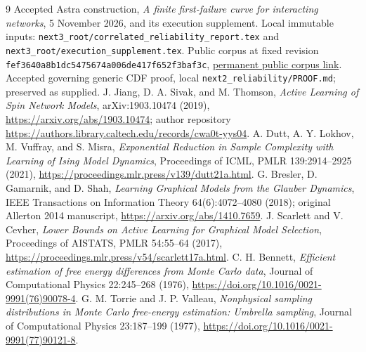 \documentclass[11pt]{article}
\begin{document}
\begin{thebibliography}{9}
 Accepted Astra construction, \emph{A finite first-failure curve for interacting networks}, 5 November 2026, and its execution supplement. Local immutable inputs: \texttt{next3\_root/correlated\_reliability\_report.tex} and \texttt{next3\_root/execution\_supplement.tex}. Public corpus at fixed revision \texttt{fef3640a8b1dc5475674a006de417f652f3baf3c}, \href{https://github.com/harjassand/astra-research-knowledge/tree/fef3640a8b1dc5475674a006de417f652f3baf3c/research/returns/2026-11-05-p3-correlated-reliability}{permanent public corpus link}.
 Accepted governing generic CDF proof, local \texttt{next2\_reliability/PROOF.md}; preserved as supplied.
 J. Jiang, D. A. Sivak, and M. Thomson, \emph{Active Learning of Spin Network Models}, arXiv:1903.10474 (2019), \url{https://arxiv.org/abs/1903.10474}; author repository \url{https://authors.library.caltech.edu/records/cwa0t-yys04}.
 A. Dutt, A. Y. Lokhov, M. Vuffray, and S. Misra, \emph{Exponential Reduction in Sample Complexity with Learning of Ising Model Dynamics}, Proceedings of ICML, PMLR 139:2914--2925 (2021), \url{https://proceedings.mlr.press/v139/dutt21a.html}.
 G. Bresler, D. Gamarnik, and D. Shah, \emph{Learning Graphical Models from the Glauber Dynamics}, IEEE Transactions on Information Theory 64(6):4072--4080 (2018); original Allerton 2014 manuscript, \url{https://arxiv.org/abs/1410.7659}.
 J. Scarlett and V. Cevher, \emph{Lower Bounds on Active Learning for Graphical Model Selection}, Proceedings of AISTATS, PMLR 54:55--64 (2017), \url{https://proceedings.mlr.press/v54/scarlett17a.html}.
 C. H. Bennett, \emph{Efficient estimation of free energy differences from Monte Carlo data}, Journal of Computational Physics 22:245--268 (1976), \url{https://doi.org/10.1016/0021-9991(76)90078-4}.
 G. M. Torrie and J. P. Valleau, \emph{Nonphysical sampling distributions in Monte Carlo free-energy estimation: Umbrella sampling}, Journal of Computational Physics 23:187--199 (1977), \url{https://doi.org/10.1016/0021-9991(77)90121-8}.
\end{thebibliography}
\end{document}
